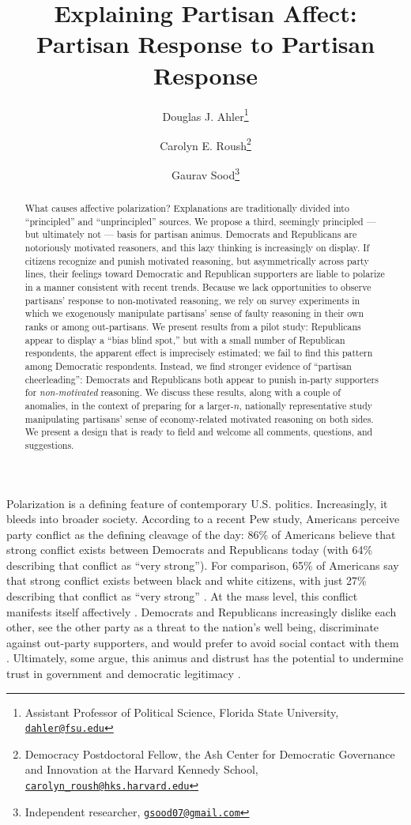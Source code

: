 \documentclass[12pt, letterpaper]{article}
\title{Explaining Partisan Affect: Partisan Response to Partisan Response}
\author{Douglas J. Ahler\thanks{Assistant Professor of Political Science, Florida State University, \href{mailto:dahler@fsu.edu}{\texttt{dahler@fsu.edu}}} \and Carolyn E. Roush\thanks{Democracy Postdoctoral Fellow, the Ash Center for Democratic Governance and Innovation at the Harvard Kennedy School, \href{mailto:carolyn_roush@hks.harvard.edu}{\texttt{carolyn\_roush@hks.harvard.edu}}} \and Gaurav Sood\thanks{Independent researcher, \href{gsood07@gmail.com}{\texttt{gsood07@gmail.com}}}}
\begin{document}
\maketitle
\thispagestyle{empty}

\begin{abstract}

\noindent What causes affective polarization? Explanations are traditionally divided into ``principled'' and ``unprincipled'' sources. We propose a third, seemingly principled --- but ultimately not --- basis for 
partisan animus. Democrats and Republicans are notoriously motivated reasoners, and this lazy thinking is increasingly on display. If citizens recognize and punish motivated reasoning, but asymmetrically across party lines, their feelings toward Democratic and Republican supporters are liable to polarize in a manner consistent with recent trends. Because we lack opportunities to observe partisans' response to non-motivated reasoning, we rely on survey experiments in which we exogenously manipulate partisans' sense of faulty reasoning in their own ranks or among out-partisans. We present results from a pilot study: Republicans appear to display a ``bias blind spot,'' but with a small number of Republican respondents, the apparent effect is imprecisely estimated; we fail to find this pattern among Democratic respondents. Instead, we find stronger evidence of ``partisan cheerleading'': Democrats and Republicans both appear to punish in-party supporters for \emph{non-motivated} reasoning. We discuss these results, along with a couple of anomalies, in the context of preparing for a larger-$n$, nationally representative study manipulating partisans' sense of economy-related motivated reasoning on both sides. We present a design that is ready to field and welcome all comments, questions, and suggestions. 

\end{abstract}

\newpage

\doublespacing
Polarization is a defining feature of contemporary U.S. politics. Increasingly, it bleeds into broader society. According to a recent Pew study, Americans perceive party conflict as the defining cleavage of the day: 86\% of Americans believe that strong conflict exists between Democrats and Republicans today (with 64\% describing that conflict as ``very strong''). For comparison, 65\% of Americans say that strong conflict exists between black and white citizens, with just 27\% describing that conflict as ``very strong'' \citep{pew2018far}. At the mass level, this conflict manifests itself affectively \citep{IyengarSoodLelkes2012}. Democrats and Republicans increasingly dislike each other, see the other party as a threat to the nation's well being, discriminate against out-party supporters, and would prefer to avoid social contact with them \citep{pew_polarization}. Ultimately, some argue, this animus and distrust has the potential to undermine trust in government and democratic legitimacy \citep{hetheringtonrudolph_2015}.
\end{document}
